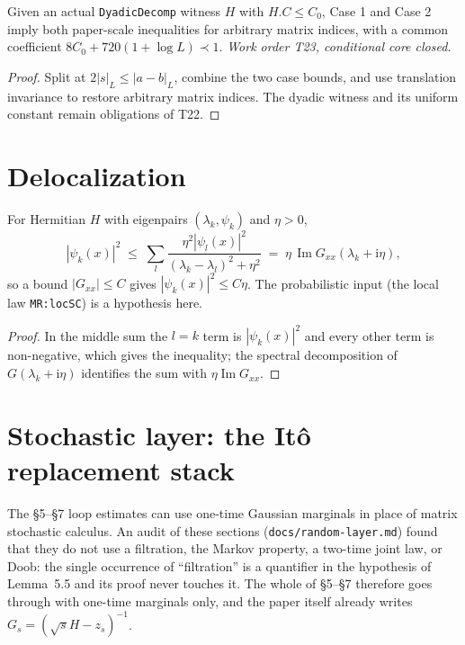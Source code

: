 \begin{lemma}
  \label{lem:propTH-6-conditional}
  \leanok
  Given an actual \texttt{DyadicDecomp} witness $H$ with $H.C\le C_0$,
  Case 1 and Case 2 imply both paper-scale inequalities for arbitrary
  matrix indices, with a common coefficient
  $8C_0+720(1+\log L)\prec1$.  \emph{Work order T23, conditional core closed.}
\end{lemma}
\begin{proof}\leanok
  Split at $2|s|_L\le|a-b|_L$, combine the two case bounds, and use
  translation invariance to restore arbitrary matrix indices.  The dyadic
  witness and its uniform constant remain obligations of T22.
\end{proof}

\chapter{Delocalization}

\begin{lemma}\label{lem:deloc}
  \leanok
  For Hermitian $H$ with eigenpairs $(\lambda_k,\psi_k)$ and $\eta>0$,
  \[ |\psi_k(x)|^2\;\le\;\sum_l\frac{\eta^2|\psi_l(x)|^2}{(\lambda_k-\lambda_l)^2+\eta^2}
     \;=\;\eta\,\operatorname{Im}G_{xx}(\lambda_k+\mathrm{i}\eta), \]
  so a bound $|G_{xx}|\le C$ gives $|\psi_k(x)|^2\le C\eta$.  The probabilistic
  input (the local law \texttt{MR:locSC}) is a hypothesis here.
\end{lemma}
\begin{proof}\leanok
  In the middle sum the $l=k$ term is $|\psi_k(x)|^2$ and every other term is
  non-negative, which gives the inequality; the spectral decomposition of
  $G(\lambda_k+\mathrm{i}\eta)$ identifies the sum with
  $\eta\operatorname{Im}G_{xx}$.
\end{proof}

\chapter{Stochastic layer: the It\^o replacement stack}

The \S5--\S7 loop estimates can use one-time Gaussian marginals in place of
matrix stochastic calculus.  An audit of these sections
(\texttt{docs/random-layer.md}) found that they do not use a
filtration, the Markov property, a two-time joint law, or Doob: the single
occurrence of ``filtration'' is a quantifier in the hypothesis of Lemma~5.5 and
its proof never touches it.  The whole of \S5--\S7 therefore goes through with
one-time marginals only, and the paper itself already writes
$G_s=(\sqrt sH-z_s)^{-1}$.

